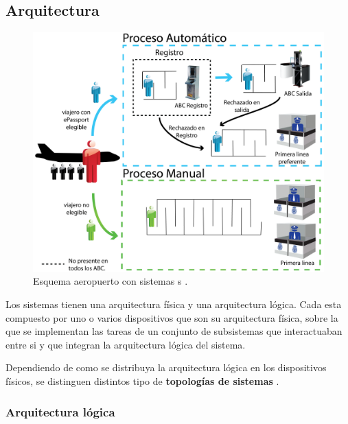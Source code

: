 \subsection{Arquitectura}\label{sec:AquitecturaABC}

\begin{figure}
    \centering
    \includegraphics[width=1\textwidth]{ch-sistemasABC/images/ch-SistemasABC/ArquitecturaEnAeropuerto.png}
    \caption{Esquema aeropuerto con sistemas s \cite{labati2016biometric}.}
    \label{fig:EsquemaAeropuerto}
\end{figure}


Los sistemas  tienen una arquitectura física y una arquitectura lógica. Cada  esta compuesto por uno o varios dispositivos que son su arquitectura física, sobre la que se implementan las tareas de un conjunto de subsistemas que interactuaban entre si y que integran la arquitectura lógica del sistema.

Dependiendo de como se distribuya la arquitectura lógica en los dispositivos físicos, se distinguen distintos tipo de \textbf{topologías de sistemas }.


\subsubsection{Arquitectura lógica}\label{subsec:ArquitecturaLogicaABC}

